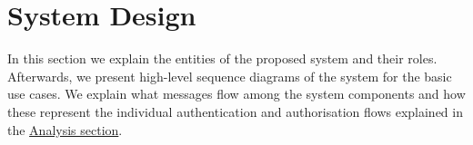 \section{System Design}

In this section we explain the entities of the proposed system and their roles. Afterwards, we present high-level sequence diagrams of the system for the basic use cases. We explain what messages flow among the system components and how these represent the individual authentication and authorisation flows explained in the \href{sec:analysis}{Analysis section}. 






